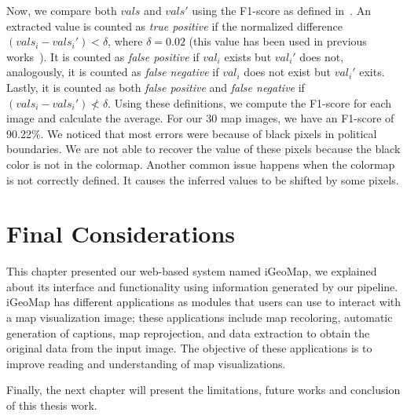 Now, we compare both $vals$ and $vals'$ using the F1-score as defined in~\citep{Siegel2016, Hou2013}. An extracted value is counted as \emph{true positive} if the normalized difference $(vals_i-vals_i')<\delta$, where $\delta=0.02$ (this value has been used in previous works~\citep{Siegel2016, Hou2013}). It is counted as \emph{false positive} if $val_i$ exists but $val_i'$ does not, analogously, it is counted as \emph{false negative} if $val_i$ does not exist but $val_i'$ exits. Lastly, it is counted as both \emph{false positive} and \emph{false negative} if $(vals_i-vals_i')\nless\delta$.
Using these definitions, we compute the F1-score for each image and calculate the average. For our 30 map images, we have an F1-score of 90.22\%. 
We noticed that most errors were because of black pixels in political boundaries. We are not able to recover the value of these pixels because the black color is not in the colormap. Another common issue happens when the colormap is not correctly defined. It causes the inferred values to be shifted by some pixels. 


\section{Final Considerations}
This chapter presented our web-based system named iGeoMap, we explained about its interface and functionality using information generated by our pipeline. iGeoMap has different applications as modules that users can use to interact with a map visualization image; these applications include map recoloring, automatic generation of captions, map reprojection, and data extraction to obtain the original data from the input image. The objective of these applications is to improve reading and understanding of map visualizations. 

Finally, the next chapter will present the limitations, future works and conclusion of this thesis work.
